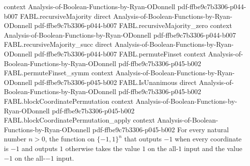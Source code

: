 \begin{theorem}
  {context}
  {Analysis-of-Boolean-Functions-by-Ryan-ODonnell}
  {pdf-ffbe9c7b3306-p044-b007}
\proofstep
  {FABL.recursiveMajority}
  {direct}
  {Analysis-of-Boolean-Functions-by-Ryan-ODonnell}
  {pdf-ffbe9c7b3306-p044-b007}
\proofstep
  {FABL.recursiveMajority_zero}
  {context}
  {Analysis-of-Boolean-Functions-by-Ryan-ODonnell}
  {pdf-ffbe9c7b3306-p044-b007}
\proofstep
  {FABL.recursiveMajority_succ}
  {direct}
  {Analysis-of-Boolean-Functions-by-Ryan-ODonnell}
  {pdf-ffbe9c7b3306-p044-b007}
\proofstep
  {FABL.permuteFinset}
  {context}
  {Analysis-of-Boolean-Functions-by-Ryan-ODonnell}
  {pdf-ffbe9c7b3306-p045-b002}
\proofstep
  {FABL.permuteFinset_symm}
  {context}
  {Analysis-of-Boolean-Functions-by-Ryan-ODonnell}
  {pdf-ffbe9c7b3306-p045-b002}
\proofstep
  {FABL.IsUnanimous}
  {direct}
  {Analysis-of-Boolean-Functions-by-Ryan-ODonnell}
  {pdf-ffbe9c7b3306-p045-b002}
\proofstep
  {FABL.blockCoordinatePermutation}
  {context}
  {Analysis-of-Boolean-Functions-by-Ryan-ODonnell}
  {pdf-ffbe9c7b3306-p045-b002}
\proofstep
  {FABL.blockCoordinatePermutation_apply}
  {context}
  {Analysis-of-Boolean-Functions-by-Ryan-ODonnell}
  {pdf-ffbe9c7b3306-p045-b002}
For every natural number $n>0$, the function on $\{-1,1\}^n$ that outputs $-1$ when
every coordinate is $-1$ and outputs $1$ otherwise takes the value $1$ on the all-$1$
input and the value $-1$ on the all-$-1$ input.
\end{theorem}


